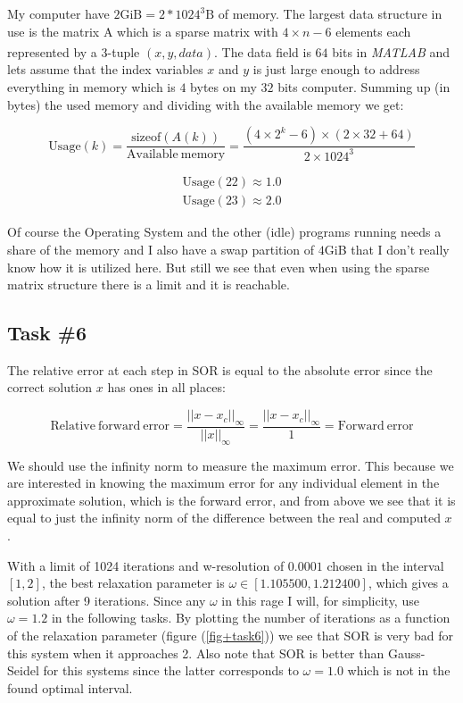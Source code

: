 \documentclass[10pt, a4paper]{article}
\newcommand{\matlab}{\small{\emph{MATLAB\textsuperscript{\textregistered}}}}
\begin{document}
My computer have $2\mathrm{GiB}=2*1024^3\mathrm{B}$ of memory. The largest data structure in use is the matrix A which is a sparse matrix with $4\times n -6$ elements each represented by a 3-tuple $(x, y, data)$. The data field is $64$ bits in \matlab{} and lets assume that the index variables $x$ and $y$ is just large enough to address everything in memory which is $4$ bytes on my $32$ bits computer. Summing up (in bytes) the used memory and dividing with the available memory we get:

\begin{displaymath}
	\mathrm{Usage}(k)=\frac{\mathrm{sizeof}(A(k))}{\mathrm{Available~memory}}=\frac{(4\times2^k-6)\times(2\times32+64)}{2\times1024^3}
\end{displaymath}

\begin{eqnarray*}
	\mathrm{Usage}(22) \approx  1.0 \\
	\mathrm{Usage}(23) \approx  2.0
\end{eqnarray*}

Of course the Operating System and the other (idle) programs running needs a share of the memory and I also have a swap partition of $4$GiB that I don't really know how it is utilized here. But still we see that even when using the sparse matrix structure there is a limit and it is reachable.

\subsection{Task \#6}
The relative error at each step in SOR is equal to the absolute error since the correct solution $x$ has ones in all places:

\begin{displaymath}
	\mathrm{Relative~forward~error} = \frac{||x-x_c||_{\infty}}{||x||_{\infty}}= \frac{||x-x_c||_{\infty}}{1}=\mathrm{Forward~error}
\end{displaymath}

We should use the infinity norm to measure the maximum error. This because we are interested in knowing the maximum error for any individual element in the approximate solution, which is the forward error, and from above we see that it is equal to just the infinity norm of the difference between the real and computed $x$ \cite{forward+error}.

With a limit of 1024 iterations and w-resolution of $0.0001$ chosen in the interval $[1, 2]$, the best relaxation parameter is $\omega \in[1.105500, 1.212400]$, which gives a solution after 9 iterations. Since any $\omega$ in this rage I will, for simplicity, use $\omega=1.2$ in the following tasks. By plotting the number of iterations as a function of the relaxation parameter (figure (\ref{fig+task6})) we see that SOR is very bad for this system when it approaches 2. Also note that SOR is better than Gauss-Seidel for this systems since the latter corresponds to $\omega=1.0$ which is not in the found optimal interval.
\end{document}
